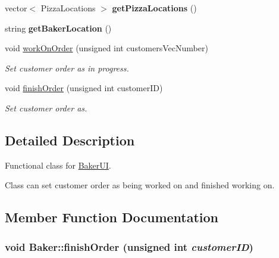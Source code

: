 \begin{CompactItemize}
\item 
\hypertarget{class_baker_3d38e7498fba59674c7d3838bf4c1824}{
vector$<$ Pizza\-Locations $>$ {\bf get\-Pizza\-Locations} ()}
\label{class_baker_3d38e7498fba59674c7d3838bf4c1824}

\item 
\hypertarget{class_baker_363b0d0c242923ca3a76ebd4e608cc2d}{
string {\bf get\-Baker\-Location} ()}
\label{class_baker_363b0d0c242923ca3a76ebd4e608cc2d}

\item 
void \hyperlink{class_baker_9616413c80f3814907a9c2399ac50438}{work\-On\-Order} (unsigned int customers\-Vec\-Number)
\begin{CompactList}\small\item\em Set customer order as in progress. \item\end{CompactList}\item 
void \hyperlink{class_baker_222a16bf113b70cbe0388a7291978a57}{finish\-Order} (unsigned int customer\-ID)
\begin{CompactList}\small\item\em Set customer order as. \item\end{CompactList}\end{CompactItemize}


\subsection{Detailed Description}
Functional class for \hyperlink{class_baker_u_i}{Baker\-UI}. 

Class can set customer order as being worked on and finished working on. 



\subsection{Member Function Documentation}
\hypertarget{class_baker_222a16bf113b70cbe0388a7291978a57}{
\subsubsection[finishOrder]{\setlength{\rightskip}{0pt plus 5cm}void Baker::finish\-Order (unsigned int {\em customer\-ID})}}
\label{class_baker_222a16bf113b70cbe0388a7291978a57}


